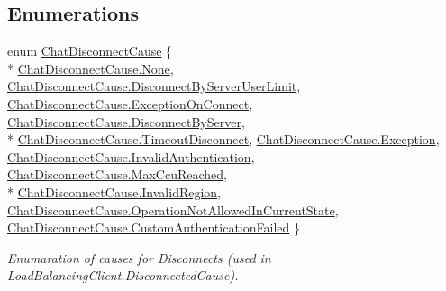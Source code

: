 \subsection*{Enumerations}
\begin{DoxyCompactItemize}
\item 
enum \hyperlink{namespace_exit_games_1_1_client_1_1_photon_1_1_chat_ae3a2988c8cb1fea31bb2d9eeafc0ed8b}{Chat\+Disconnect\+Cause} \{ \\*
\hyperlink{namespace_exit_games_1_1_client_1_1_photon_1_1_chat_ae3a2988c8cb1fea31bb2d9eeafc0ed8ba6adf97f83acf6453d4a6a4b1070f3754}{Chat\+Disconnect\+Cause.\+None}, 
\hyperlink{namespace_exit_games_1_1_client_1_1_photon_1_1_chat_ae3a2988c8cb1fea31bb2d9eeafc0ed8ba443ec8de9a697e190f4b24ab3ab36a9d}{Chat\+Disconnect\+Cause.\+Disconnect\+By\+Server\+User\+Limit}, 
\hyperlink{namespace_exit_games_1_1_client_1_1_photon_1_1_chat_ae3a2988c8cb1fea31bb2d9eeafc0ed8bae28f71975b160263c7e6438b4b4429ef}{Chat\+Disconnect\+Cause.\+Exception\+On\+Connect}, 
\hyperlink{namespace_exit_games_1_1_client_1_1_photon_1_1_chat_ae3a2988c8cb1fea31bb2d9eeafc0ed8ba0777deff381bd76ec1ab2dc434860022}{Chat\+Disconnect\+Cause.\+Disconnect\+By\+Server}, 
\\*
\hyperlink{namespace_exit_games_1_1_client_1_1_photon_1_1_chat_ae3a2988c8cb1fea31bb2d9eeafc0ed8bad376a854099d47f8a5279893e854ec27}{Chat\+Disconnect\+Cause.\+Timeout\+Disconnect}, 
\hyperlink{namespace_exit_games_1_1_client_1_1_photon_1_1_chat_ae3a2988c8cb1fea31bb2d9eeafc0ed8bab0d4998a26f5b5742ad38c4af8817e32}{Chat\+Disconnect\+Cause.\+Exception}, 
\hyperlink{namespace_exit_games_1_1_client_1_1_photon_1_1_chat_ae3a2988c8cb1fea31bb2d9eeafc0ed8bab67551dad56fc73fd4a580e810dc5f7f}{Chat\+Disconnect\+Cause.\+Invalid\+Authentication}, 
\hyperlink{namespace_exit_games_1_1_client_1_1_photon_1_1_chat_ae3a2988c8cb1fea31bb2d9eeafc0ed8ba522f961eb7a2b35f0ef4b99b4ad3bb0a}{Chat\+Disconnect\+Cause.\+Max\+Ccu\+Reached}, 
\\*
\hyperlink{namespace_exit_games_1_1_client_1_1_photon_1_1_chat_ae3a2988c8cb1fea31bb2d9eeafc0ed8baa8534012cb63e62c0b3a2335206117cc}{Chat\+Disconnect\+Cause.\+Invalid\+Region}, 
\hyperlink{namespace_exit_games_1_1_client_1_1_photon_1_1_chat_ae3a2988c8cb1fea31bb2d9eeafc0ed8ba85a7970b25fcbdfd2f82f78609298e56}{Chat\+Disconnect\+Cause.\+Operation\+Not\+Allowed\+In\+Current\+State}, 
\hyperlink{namespace_exit_games_1_1_client_1_1_photon_1_1_chat_ae3a2988c8cb1fea31bb2d9eeafc0ed8bac18fb72fa24e41efb70cd214f7681dfc}{Chat\+Disconnect\+Cause.\+Custom\+Authentication\+Failed}
 \}\begin{DoxyCompactList}\small\item\em Enumaration of causes for Disconnects (used in Load\+Balancing\+Client.\+Disconnected\+Cause). \end{DoxyCompactList}

\end{DoxyCompactItemize}
